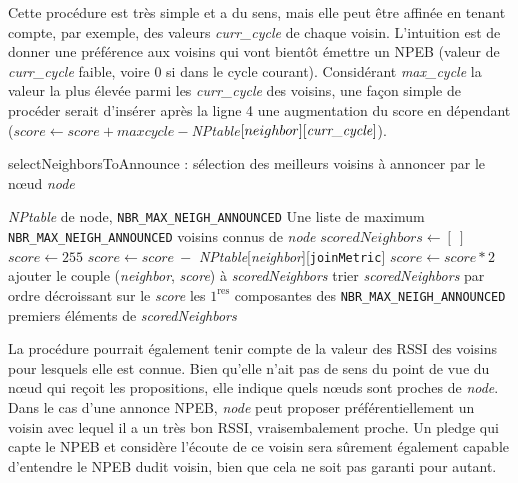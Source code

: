 \documentclass[]{report}
\begin{document}
\newpage

Cette procédure est très simple et a du sens, mais elle peut être affinée en tenant compte, par exemple, des valeurs \textit{curr\_cycle} de chaque voisin. L'intuition est de donner une préférence aux voisins qui vont bientôt émettre un NPEB (valeur de \textit{curr\_cycle} faible, voire 0 si dans le cycle courant). Considérant \textit{max\_cycle} la valeur la plus élevée parmi les \textit{curr\_cycle} des voisins, une façon simple de procéder serait d'insérer après la ligne 4 une augmentation du score en dépendant ($score \leftarrow score +  maxcycle - $\textit{NPtable}$[neighbor][\text{\textit{curr\_cycle}}]$).

\vspace{0.3cm}
\begin{algorithm}[!h]
\caption{selectNeighborsToAnnounce : sélection des meilleurs voisins à annoncer par le nœud \textit{node}}
\begin{algorithmic}[1]
\Require \textit{NPtable} de node, \texttt{NBR\_MAX\_NEIGH\_ANNOUNCED}
\Ensure Une liste de maximum \texttt{NBR\_MAX\_NEIGH\_ANNOUNCED} voisins connus de \textit{node}
\State $scoredNeighbors \leftarrow [\ ]$
\State $score \leftarrow 255$
\State $score \leftarrow score\ - $ \textit{NPtable}[\textit{neighbor}][\texttt{joinMetric}]
\State $score \leftarrow score * 2$
\EndIf
\State ajouter le couple (\textit{neighbor}, \textit{score}) à \textit{scoredNeighbors}
\EndFor
\State trier \textit{scoredNeighbors} par ordre décroissant sur le \textit{score}
\State\Return les $1^{\text{res}}$ composantes des \texttt{NBR\_MAX\_NEIGH\_ANNOUNCED} premiers éléments de \textit{scoredNeighbors}
\end{algorithmic}
\label{proc_announce}
\end{algorithm}
\vspace{0.2cm}

La procédure pourrait également tenir compte de la valeur des RSSI des voisins pour lesquels elle est connue. Bien qu'elle n'ait pas de sens du point de vue du nœud qui reçoit les propositions, elle indique quels nœuds sont proches de \textit{node}. Dans le cas d'une annonce NPEB, \textit{node} peut proposer préférentiellement un voisin avec lequel il a un très bon RSSI, vraisembalement proche. Un pledge qui capte le NPEB et considère l'écoute de ce voisin sera sûrement également capable d'entendre le NPEB dudit voisin, bien que cela ne soit pas garanti pour autant.
\end{document}

